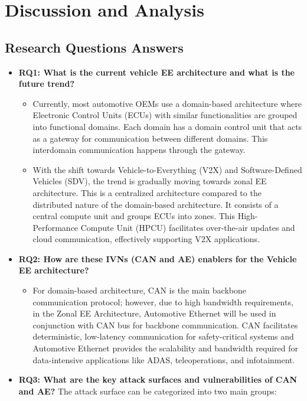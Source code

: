 \documentclass{report}
\begin{document}
\section{Discussion and Analysis}

\subsection{Research Questions Answers}
\begin{itemize}
    \item \textbf{RQ1: What is the current vehicle EE architecture and what is the future trend?}
        \begin{itemize}
            \item Currently, most automotive OEMs use a domain-based architecture where Electronic Control Units (ECUs) with similar functionalities are grouped into functional domains. Each domain has a domain control unit that acts as a gateway for communication between different domains. This interdomain communication happens through the gateway.
            \item With the shift towards Vehicle-to-Everything (V2X) and Software-Defined Vehicles (SDV), the trend is gradually moving towards zonal EE architecture. This is a centralized architecture compared to the distributed nature of the domain-based architecture. It consists of a central compute unit and groups ECUs into zones. This High-Performance Compute Unit (HPCU) facilitates over-the-air updates and cloud communication, effectively supporting V2X applications.
        \end{itemize}
        
    \item \textbf{RQ2: How are these IVNs (CAN and AE) enablers for the Vehicle EE architecture?}
        \begin{itemize}
            \item For domain-based architecture, CAN is the main backbone communication protocol; however, due to high bandwidth requirements, in the Zonal EE Architecture, Automotive Ethernet will be used in conjunction with CAN bus for backbone communication. CAN facilitates deterministic, low-latency communication for safety-critical systems and Automotive Ethernet provides the scalability and bandwidth required for data-intensive applications like ADAS, teleoperations, and infotainment.
        \end{itemize}

    \item \textbf{RQ3: What are the key attack surfaces and vulnerabilities of CAN and AE?}
The attack surface can be categorized into two main groups:


\end{itemize}
\end{document}
